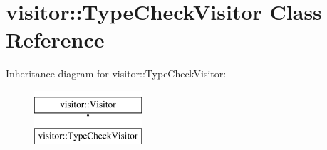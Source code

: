 \hypertarget{classvisitor_1_1TypeCheckVisitor}{}\section{visitor\+:\+:Type\+Check\+Visitor Class Reference}
\label{classvisitor_1_1TypeCheckVisitor}
Inheritance diagram for visitor\+:\+:Type\+Check\+Visitor\+:\begin{figure}[H]
\begin{center}
\leavevmode
\includegraphics[height=2.000000cm]{d8/d91/classvisitor_1_1TypeCheckVisitor}
\end{center}
\end{figure}
